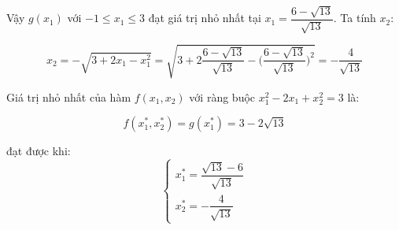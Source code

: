 \documentclass[14pt, a4paper]{article}
\theoremstyle{sltheorem}
\theoremstyle{soltheorem}
\begin{document}
    Vậy $g(x_1)$ với $-1 \leq x_1 \leq 3$ đạt giá trị nhỏ nhất tại $x_1 = \dfrac{6 - \sqrt{13}}{\sqrt{13}}$.
    Ta tính $x_2$:

    \begin{equation}
        x_2 = - \sqrt{3 + 2x_1 - x_1^2}= \sqrt{3 + 2 \dfrac{6 - \sqrt{13}}{\sqrt{13}} - \Big( \dfrac{6 - \sqrt{13}}{\sqrt{13}} \Big)^2} = -\dfrac{4}{\sqrt{13}}
    \end{equation}

    Giá trị nhỏ nhất của hàm $f(x_1, x_2)$ với ràng buộc $x_1^2 - 2x_1 + x_2^2 = 3$ là:

    \begin{equation*}
        f(x_1^*, x_2^*) = g(x_1^{*}) = 3 - 2\sqrt{13}
    \end{equation*}

    đạt được khi:
    \begin{equation*}
        \begin{cases} 
            x_1^* = \dfrac{\sqrt{13} - 6}{\sqrt{13}} \\ 
            x_2^* = - \dfrac{4}{\sqrt{13}} 
        \end{cases}
    \end{equation*}

    \newpage
    \printbibliography[title={TÀI LIỆU THAM KHẢO}]
\end{document}
